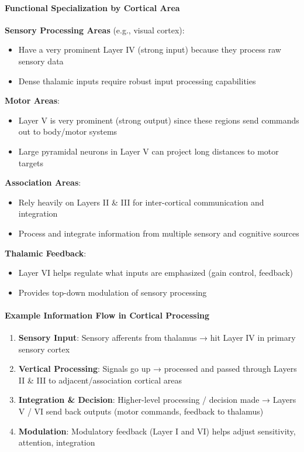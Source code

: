 \paragraph{Functional Specialization by Cortical Area}

\textbf{Sensory Processing Areas} (e.g., visual cortex):

\begin{itemize}
\item Have a very prominent Layer IV (strong input) because they process raw sensory data
\item Dense thalamic inputs require robust input processing capabilities
\end{itemize}

\textbf{Motor Areas}:

\begin{itemize}
\item Layer V is very prominent (strong output) since these regions send commands out to body/motor systems
\item Large pyramidal neurons in Layer V can project long distances to motor targets
\end{itemize}

\textbf{Association Areas}:

\begin{itemize}
\item Rely heavily on Layers II \& III for inter-cortical communication and integration
\item Process and integrate information from multiple sensory and cognitive sources
\end{itemize}

\textbf{Thalamic Feedback}:

\begin{itemize}
\item Layer VI helps regulate what inputs are emphasized (gain control, feedback)
\item Provides top-down modulation of sensory processing
\end{itemize}

\paragraph{Example Information Flow in Cortical Processing}

\begin{enumerate}
\item \textbf{Sensory Input}: Sensory afferents from thalamus → hit Layer IV in primary sensory cortex
\item \textbf{Vertical Processing}: Signals go up → processed and passed through Layers II \& III to adjacent/association cortical areas
\item \textbf{Integration \& Decision}: Higher-level processing / decision made → Layers V / VI send back outputs (motor commands, feedback to thalamus)
\item \textbf{Modulation}: Modulatory feedback (Layer I and VI) helps adjust sensitivity, attention, integration
\end{enumerate}

